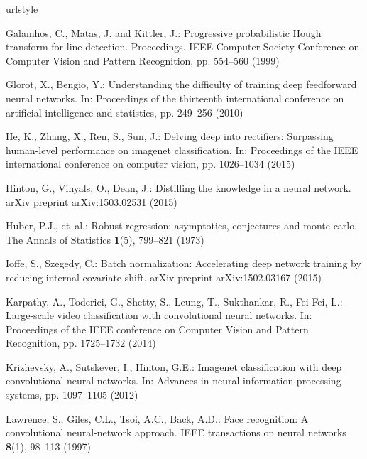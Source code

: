 \documentclass{svjour3}                     %
\begin{document}
\begin{thebibliography}{17}
\providecommand{\url}[1]{{#1}}
\providecommand{\urlprefix}{URL }
\expandafter\ifx\csname urlstyle\endcsname\relax
  \providecommand{\doi}[1]{DOI~\discretionary{}{}{}#1}\else
  \providecommand{\doi}{DOI~\discretionary{}{}{}\begingroup
  \urlstyle{rm}\Url}\fi

Galamhos, C., Matas, J. and Kittler, J.: Progressive probabilistic Hough transform for line detection.
\newblock Proceedings. IEEE Computer Society Conference on Computer Vision and Pattern Recognition, pp. 554--560 (1999)

Glorot, X., Bengio, Y.: Understanding the difficulty of training deep
  feedforward neural networks.
\newblock In: Proceedings of the thirteenth international conference on
  artificial intelligence and statistics, pp. 249--256 (2010)

He, K., Zhang, X., Ren, S., Sun, J.: Delving deep into rectifiers: Surpassing
  human-level performance on imagenet classification.
\newblock In: Proceedings of the IEEE international conference on computer
  vision, pp. 1026--1034 (2015)

Hinton, G., Vinyals, O., Dean, J.: Distilling the knowledge in a neural
  network.
\newblock arXiv preprint arXiv:1503.02531  (2015)

Huber, P.J., et~al.: Robust regression: asymptotics, conjectures and monte
  carlo.
\newblock The Annals of Statistics \textbf{1}(5), 799--821 (1973)

Ioffe, S., Szegedy, C.: Batch normalization: Accelerating deep network training
  by reducing internal covariate shift.
\newblock arXiv preprint arXiv:1502.03167  (2015)

Karpathy, A., Toderici, G., Shetty, S., Leung, T., Sukthankar, R., Fei-Fei, L.:
  Large-scale video classification with convolutional neural networks.
\newblock In: Proceedings of the IEEE conference on Computer Vision and Pattern
  Recognition, pp. 1725--1732 (2014)

Krizhevsky, A., Sutskever, I., Hinton, G.E.: Imagenet classification with deep
  convolutional neural networks.
\newblock In: Advances in neural information processing systems, pp. 1097--1105
  (2012)

Lawrence, S., Giles, C.L., Tsoi, A.C., Back, A.D.: Face recognition: {A}
  convolutional neural-network approach.
\newblock IEEE transactions on neural networks \textbf{8}(1), 98--113 (1997)


\end{thebibliography}
\end{document}
